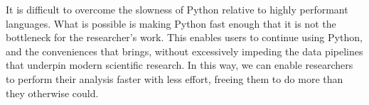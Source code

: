 \documentclass[conference]{IEEEtran}
\begin{document}
It is difficult to overcome the slowness of Python relative to
highly performant languages.
What is possible is making Python fast enough that it is not the 
bottleneck for the researcher's work.
This enables users to continue using Python, and the conveniences that 
brings, without excessively impeding the data pipelines that underpin 
modern scientific research.
In this way, we can enable researchers to perform their analysis
faster with less effort, freeing them to do more than they otherwise 
could.







\end{document}
